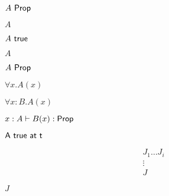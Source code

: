 \documentclass[10pt]{book}
\begin{document}
\begin{mdSnippets}
\begin{mdInlineSnippet}[3f7fd61a4a2fe89ac1bbb0a8287739fa]%
$A\  {\sf Prop}$\end{mdInlineSnippet}%
\begin{mdInlineSnippet}[7fc56270e7a70fa81a5935b72eacbe29]%
$A$\end{mdInlineSnippet}%
\begin{mdInlineSnippet}%
$A\  {\sf true}$\end{mdInlineSnippet}%
\begin{mdInlineSnippet}[7fc56270e7a70fa81a5935b72eacbe29]%
$A$\end{mdInlineSnippet}%
\begin{mdInlineSnippet}[3f7fd61a4a2fe89ac1bbb0a8287739fa]%
$A\  {\sf Prop}$\end{mdInlineSnippet}%
\begin{mdInlineSnippet}[bab499c670813159203b82c7f39924af]%
$\forall x. A(x)$\end{mdInlineSnippet}%
\begin{mdInlineSnippet}[b45d5f45964813b64387ae495105d32f]%
$\forall x:B. A(x)$\end{mdInlineSnippet}%
\begin{mdInlineSnippet}[d11090f34321bb2eb6b8dc7396927a24]%
$x:A\vdash B(x):{\sf Prop}$\end{mdInlineSnippet}%
\begin{mdInlineSnippet}%
${\sf A \ true \ at \ t}$\end{mdInlineSnippet}%
\begin{mdDisplaySnippet}%
\[%
  {\begin{array}{c}
  {J_1 \ldots J_i}  \\
  \vdots \\
  {J} 
  \end{array} } 
\]%
\end{mdDisplaySnippet}%
\begin{mdInlineSnippet}%
$J$\end{mdInlineSnippet}%
\begin{mdInlineSnippet}[6bd4272995f4b86000f31722ebc327bf]%

\end{mdInlineSnippet}
\end{mdSnippets}
\end{document}
